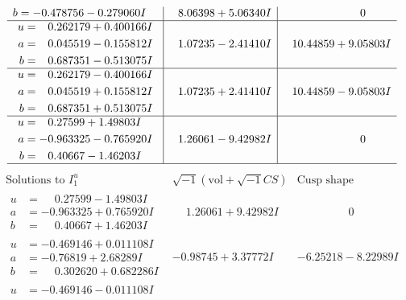 \documentclass[1p]{elsarticle_modified}
\theoremstyle{definition}
\newcommand{\I}{\sqrt{-1}}
\begin{document}
$$\begin{array}{c|c|c}
\begin{aligned}
b &= -0.478756 - 0.279060 I\end{aligned}
 & \phantom{-}8.06398 + 5.06340 I & \phantom{-0.000000 } 0 \\ \hline\begin{aligned}
u &= \phantom{-}0.262179 + 0.400166 I \\
a &= \phantom{-}0.045519 - 0.155812 I \\
b &= \phantom{-}0.687351 - 0.513075 I\end{aligned}
 & \phantom{-}1.07235 - 2.41410 I & \phantom{-}10.44859 + 9.05803 I \\ \hline\begin{aligned}
u &= \phantom{-}0.262179 - 0.400166 I \\
a &= \phantom{-}0.045519 + 0.155812 I \\
b &= \phantom{-}0.687351 + 0.513075 I\end{aligned}
 & \phantom{-}1.07235 + 2.41410 I & \phantom{-}10.44859 - 9.05803 I \\ \hline\begin{aligned}
u &= \phantom{-}0.27599 + 1.49803 I \\
a &= -0.963325 - 0.765920 I \\
b &= \phantom{-}0.40667 - 1.46203 I\end{aligned}
 & \phantom{-}1.26061 - 9.42982 I & \phantom{-0.000000 } 0\\
 \hline 
 \end{array}$$\newpage$$\begin{array}{c|c|c}  
\text{Solutions to }I^u_{1}& \I (\text{vol} + \sqrt{-1}CS) & \text{Cusp shape}\\
 \hline 
\begin{aligned}
u &= \phantom{-}0.27599 - 1.49803 I \\
a &= -0.963325 + 0.765920 I \\
b &= \phantom{-}0.40667 + 1.46203 I\end{aligned}
 & \phantom{-}1.26061 + 9.42982 I & \phantom{-0.000000 } 0 \\ \hline\begin{aligned}
u &= -0.469146 + 0.011108 I \\
a &= -0.76819 + 2.68289 I \\
b &= \phantom{-}0.302620 + 0.682286 I\end{aligned}
 & -0.98745 + 3.37772 I & -6.25218 - 8.22989 I \\ \hline\begin{aligned}
u &= -0.469146 - 0.011108 I \\

\end{aligned}
\end{array}$$
\end{document}
